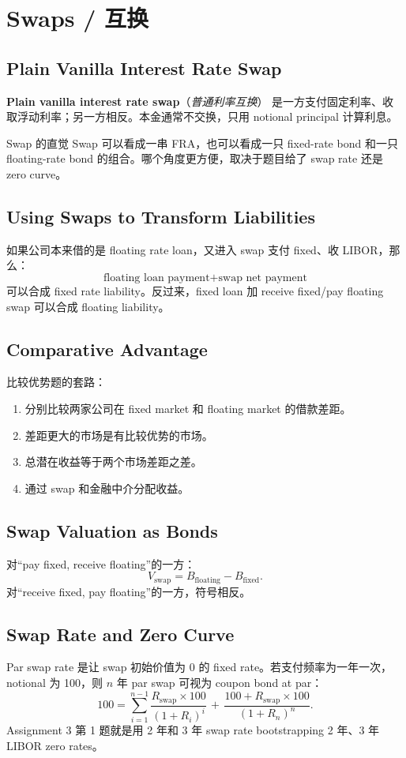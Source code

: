 \documentclass[11pt,a4paper,openany]{ctexbook}
\newcommand{\term}[2]{\textbf{#1}（\emph{#2}）}
\newcommand{\source}[1]{\par\smallskip\noindent{\small\textcolor{muted}{Source: #1}}\par}
\begin{document}
\chapter{Swaps / 互换}
\source{Lecture 8; Assignment 3}

\section{Plain Vanilla Interest Rate Swap}
\term{Plain vanilla interest rate swap}{普通利率互换} 是一方支付固定利率、收取浮动利率；另一方相反。本金通常不交换，只用 notional principal 计算利息。

\begin{intuitionbox}{Swap 的直觉}
Swap 可以看成一串 FRA，也可以看成一只 fixed-rate bond 和一只 floating-rate bond 的组合。哪个角度更方便，取决于题目给了 swap rate 还是 zero curve。
\end{intuitionbox}

\section{Using Swaps to Transform Liabilities}
如果公司本来借的是 floating rate loan，又进入 swap 支付 fixed、收 LIBOR，那么：
\[
\text{floating loan payment}+\text{swap net payment}
\]
可以合成 fixed rate liability。反过来，fixed loan 加 receive fixed/pay floating swap 可以合成 floating liability。

\section{Comparative Advantage}
比较优势题的套路：
\begin{enumerate}
  \item 分别比较两家公司在 fixed market 和 floating market 的借款差距。
  \item 差距更大的市场是有比较优势的市场。
  \item 总潜在收益等于两个市场差距之差。
  \item 通过 swap 和金融中介分配收益。
\end{enumerate}

\section{Swap Valuation as Bonds}
对“pay fixed, receive floating”的一方：
\[
V_{\text{swap}}=B_{\text{floating}}-B_{\text{fixed}}.
\]
对“receive fixed, pay floating”的一方，符号相反。

\section{Swap Rate and Zero Curve}
Par swap rate 是让 swap 初始价值为 0 的 fixed rate。若支付频率为一年一次，notional 为 100，则 $n$ 年 par swap 可视为 coupon bond at par：
\[
100=\sum_{i=1}^{n-1}\frac{R_{\text{swap}}\times100}{(1+R_i)^i}
\,+\,\frac{100+R_{\text{swap}}\times100}{(1+R_n)^n}.
\]
Assignment 3 第 1 题就是用 2 年和 3 年 swap rate bootstrapping 2 年、3 年 LIBOR zero rates。
\end{document}
